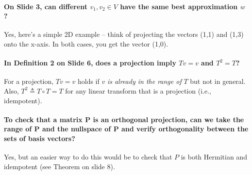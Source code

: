 \documentclass[10pt,english]{article}
\begin{document}
%

\paragraph{On Slide 3, can different $v_1,v_2 \in V$ have the same best approximation $w$?}
Yes, here's a simple 2D example -- think of projecting the vectors (1,1) and (1,3) onto the x-axis. In both cases, you get the vector (1,0).

\paragraph{In Definition 2 on Slide 6, does a projection imply $Tv= v$ and $T^2=T$?}
For a projection, $Tv=v$ holds if $v$ \textit{is already in the range of} $T$ but not in general. Also, $T^2 \triangleq T \circ T = T$ for any linear transform that is a projection (i.e., idempotent).

\paragraph{To check that a matrix P is an orthogonal projection, can we take the range of P and the nullspace of P and verify orthogonality between the sets of basis vectors?}
Yes, but an easier way to do this would be to check that $P$ is both Hermitian and idempotent (see Theorem on slide 8).
\end{document}
